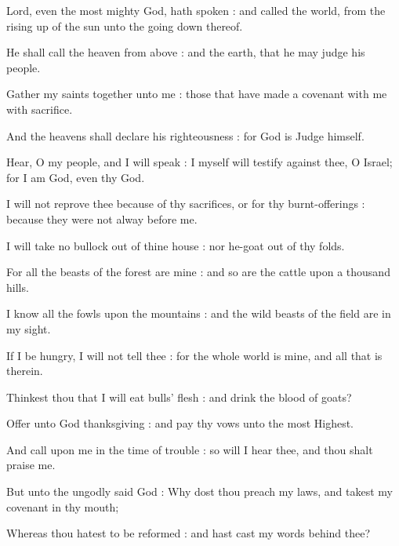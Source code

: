 

 Lord, even the most mighty God, hath spoken : and called the world, from the rising up of the sun unto the going down thereof.\par
{}
He shall call the heaven from above : and the earth, that he may judge his people.\par
{}Gather my saints together unto me : those that have made a covenant with me with sacrifice.\par
{}And the heavens shall declare his righteousness : for God is Judge himself.\par
{}Hear, O my people, and I will speak : I myself will testify against thee, O Israel; for I am God, even thy God.\par
{}I will not reprove thee because of thy sacrifices, or for thy burnt-offerings : because they were not alway before me.\par
{}I will take no bullock out of thine house : nor he-goat out of thy folds.\par
{}For all the beasts of the forest are mine : and so are the cattle upon a thousand hills.\par
{}I know all the fowls upon the mountains : and the wild beasts of the field are in my sight.\par
{}If I be hungry, I will not tell thee : for the whole world is mine, and all that is therein.\par
{}Thinkest thou that I will eat bulls' flesh : and drink the blood of goats?\par
{}Offer unto God thanksgiving : and pay thy vows unto the most Highest.\par
{}And call upon me in the time of trouble : so will I hear thee, and thou shalt praise me.\par
{}But unto the ungodly said God : Why dost thou preach my laws, and takest my covenant in thy mouth;\par
{}Whereas thou hatest to be reformed : and hast cast my words behind thee?\par
